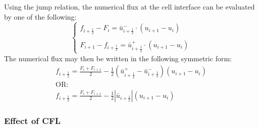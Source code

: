\documentclass[11pt, a4paper]{article}
\begin{document}
Using the jump relation, the numerical flux at the cell interface can be evaluated by one of the following:
\begin{equation}
    \left\{\begin{array}{l}
        f_{i+\frac{1}{2}}-F_i = \bar{u}_{i+\frac{1}{2}}^-\cdot\left(u_{i+1}-u_i\right) \\\\
        F_{i+1}-f_{i+\frac{1}{2}}=\bar{u}_{i+\frac{1}{2}}^+\cdot\left(u_{i+1}-u_i\right)
    \end{array}\right.
\end{equation}
The numerical flux may then be written in the following symmetric form:
\begin{equation}
    \begin{array}{l}
        \displaystyle f_{i+\frac{1}{2}}=\frac{F_i+F_{i+1}}{2}-\frac{1}{2}\left(\bar{u}_{i+\frac{1}{2}}^+-\bar{u}_{i+\frac{1}{2}}^-\right)\left(u_{i+1}-u_i\right) \\
        \mathrm{OR:} \\
        \displaystyle f_{i+\frac{1}{2}}=\frac{F_i+F_{i+1}}{2}-\frac{1}{2}\left|\bar{u}_{i+\frac{1}{2}}\right|\left(u_{i+1}-u_i\right)
    \end{array}
\end{equation}


\subsubsection{Effect of CFL}
\end{document}
